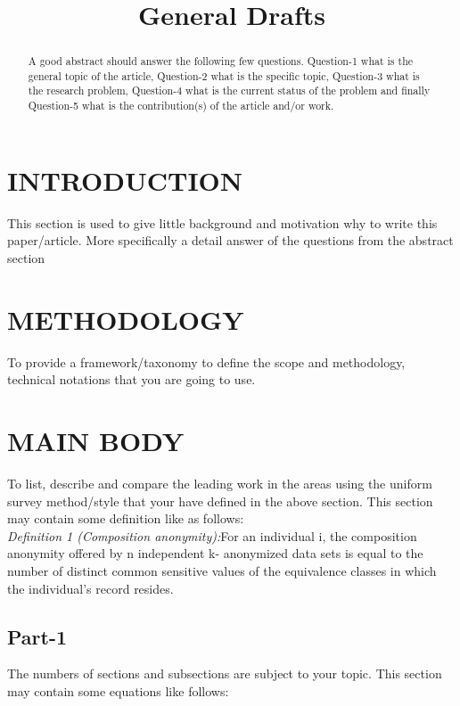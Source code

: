 \documentclass[conference]{IEEEtran}
\begin{document}
\title{General Drafts}



\maketitle


\begin{abstract}
A good abstract should answer the following few
questions. Question-1 what is the general topic of the article,
Question-2 what is the specific topic, Question-3 what is the
research problem, Question-4 what is the current status of the
problem and finally Question-5 what is the contribution(s) of the
article and/or work.
\end{abstract}

\section{INTRODUCTION}
This section is used to give little background and motivation
why to write this paper/article. More specifically a detail
answer of the questions from the abstract section



\section{METHODOLOGY}
To provide a framework/taxonomy to define the scope and
methodology, technical notations that you are going to use.

\section{MAIN BODY}
To list, describe and compare the leading work in the areas
using the uniform survey method/style that your have defined
in the above section. This section may contain some definition
like as follows:\\
\textit{Definition 1 (Composition anonymity):}For an individual i,
the composition anonymity offered by n independent k-
anonymized data sets is equal to the number of distinct
common sensitive values of the equivalence classes in which
the individual’s record resides.\\

\subsection{Part-1}
The numbers of sections and subsections are subject to your topic. This section may contain some equations like follows:
\end{document}
